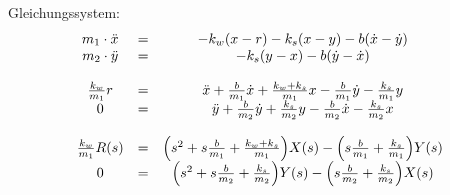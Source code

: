 \begin{tcolorbox}[colback=white!10!white,
                  colframe=gray!50!black,
                  title=Beispiel]
\begin{minipage}{0.65\textwidth}
    \end{minipage}
    Gleichungssystem:
    \begin{equation*}\begin{matrix}
        m_1 \cdot \ddot{x} & = & -k_w(x-r) - k_s(x-y) - b(\dot{x}-\dot{y}) \\
        m_2 \cdot \ddot{y} & = & -k_s(y-x) - b(\dot{y}-\dot{x}) \\\\
        \frac{k_w}{m_1} r & =
            & \ddot{x} + \frac{b}{m_1} \dot{x} + \frac{k_w+k_s}{m_1} x
            - \frac{b}{m_1} \dot{y} - \frac{k_s}{m_1} y \\ 
        0 & = & \ddot{y} + \frac{b}{m_2} \dot{y} + \frac{k_s}{m_2} y
            - \frac{b}{m_2} \dot{x} - \frac{k_s}{m_2} x \\\\
        \frac{k_w}{m_1} R(s) & =
            & \Bigl( s^2 + s\frac{b}{m_1} + \frac{k_w+k_s}{m_1} \Bigr) X(s)
            - \Bigl(s\frac{b}{m_1} + \frac{k_s}{m_1} \Bigr) Y(s) \\ 
        0 & = & \Bigl( s^2 + s\frac{b}{m_2} + \frac{k_s}{m_2} \Bigr) Y(s)
            - \Bigl( s\frac{b}{m_2} + \frac{k_s}{m_2} \Bigr) X(s) \\\\
    \end{matrix}\end{equation*}
\end{tcolorbox}